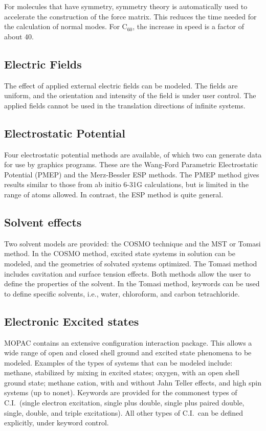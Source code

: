 For molecules that have symmetry, symmetry theory is automatically used to
accelerate the construction of the force matrix.  This reduces the time needed
for  the calculation of normal modes.  For C$_{60}$, the increase in speed is a
factor of  about 40.

\subsection{Electric Fields}

The effect of applied external electric fields can be modeled.  The fields are
uniform, and the orientation and intensity of the field is under user control.
The  applied fields cannot be used in the translation directions of infinite
systems.

\subsection{Electrostatic Potential}

Four electrostatic potential methods are available, of which two can generate
data for use by graphics programs. These are the Wang-Ford Parametric
Electrostatic Potential (PMEP) and the Merz-Bessler ESP methods.  The PMEP
method gives results similar to those from ab initio 6-31G calculations, but
is  limited in the range of atoms allowed.  In contrast, the ESP method is
quite  general.

\subsection{Solvent effects}

Two solvent models are provided: the COSMO technique and the MST or  Tomasi
method.  In the COSMO method, excited state systems in solution can  be
modeled, and the geometries of solvated systems optimized.  The Tomasi  method
includes cavitation and surface tension effects.  Both methods allow the  user
to define the properties of the solvent.  In the Tomasi method, keywords  can
be used to define specific solvents, i.e., water, chloroform, and carbon
tetrachloride.

\subsection{Electronic Excited states}

MOPAC contains an extensive configuration interaction package.  This allows a
wide range of open and closed shell ground and excited state phenomena to be
modeled.  Examples of the types of systems that can be modeled include:
methane, stabilized by mixing in excited states; oxygen, with an open shell
ground state; methane cation, with and without Jahn Teller effects, and high
spin  systems (up to nonet).  Keywords are provided for the commonest types of
C.I.\  (single electron excitation, single plus double, single plus paired
double, single,  double, and triple excitations).  All other types of C.I.\ can
be defined explicitly,  under keyword control.

